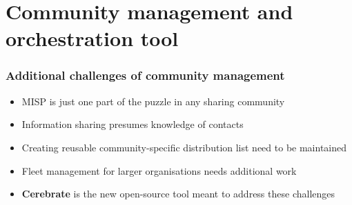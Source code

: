 \section{Community management and orchestration tool}
\begin{frame}
    \frametitle{Additional challenges of community management}
    \begin{itemize}
        \item MISP is just one part of the puzzle in any sharing community
        \item Information sharing presumes knowledge of contacts
        \item Creating reusable community-specific distribution list need to be maintained
        \item Fleet management for larger organisations needs additional work
        \item \textbf{Cerebrate} is the new open-source tool meant to address these challenges
    \end{itemize}
\end{frame}

